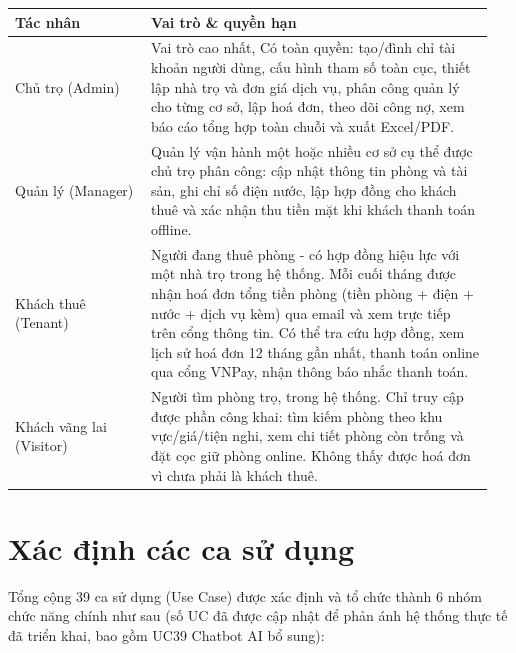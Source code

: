 \documentclass[a4paper,oneside]{report}
\begin{document}
\begin{longtable}[]{@{}>{\RaggedRight\arraybackslash}p{0.27\linewidth}>{\RaggedRight\arraybackslash}p{0.68\linewidth}@{}}
\toprule
\textbf{Tác nhân} & \textbf{Vai trò \& quyền hạn}\tabularnewline
\midrule
\endhead
Chủ trọ (Admin) & Vai trò cao nhất, Có toàn quyền:
tạo/đình chỉ tài khoản người dùng, cấu hình tham số toàn cục, thiết lập
nhà trọ và đơn giá dịch vụ, phân công quản lý cho từng cơ sở, lập hoá
đơn, theo dõi công nợ, xem báo cáo tổng hợp toàn chuỗi và xuất
Excel/PDF.\tabularnewline
Quản lý (Manager) & Quản lý vận hành một hoặc nhiều cơ sở cụ thể được
chủ trọ phân công: cập nhật thông tin phòng và tài sản, ghi chỉ số điện
nước, lập hợp đồng cho khách thuê và xác nhận thu tiền mặt khi khách
thanh toán offline.\tabularnewline
Khách thuê (Tenant) & Người đang thuê phòng - có hợp đồng hiệu lực với
một nhà trọ trong hệ thống. Mỗi cuối tháng được nhận hoá đơn tổng tiền
phòng (tiền phòng + điện + nước + dịch vụ kèm) qua email và xem trực
tiếp trên cổng thông tin. Có thể tra cứu hợp đồng, xem lịch sử hoá đơn
12 tháng gần nhất, thanh toán online qua cổng VNPay, nhận thông báo nhắc thanh toán.\tabularnewline
Khách vãng lai (Visitor) & Người tìm phòng trọ,
trong hệ thống. Chỉ truy cập được phần công khai: tìm kiếm phòng theo
khu vực/giá/tiện nghi, xem chi tiết phòng còn trống và đặt cọc giữ phòng
online. Không thấy được hoá đơn vì chưa phải là khách
thuê.\tabularnewline
\bottomrule
\end{longtable}

\section{Xác định các ca sử dụng}

Tổng cộng 39 ca sử dụng (Use Case) được xác định và tổ chức thành 6 nhóm
chức năng chính như sau (số UC đã được cập nhật để phản ánh hệ thống
thực tế đã triển khai, bao gồm UC39 Chatbot AI bổ sung):
\end{document}
